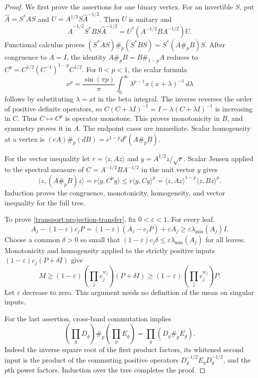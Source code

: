 \begin{proof}
We first prove the assertions for one binary vertex.  For an invertible
$S$, put $\widehat A=S^*AS$ and
$U=A^{1/2}S\widehat A^{-1/2}$.  Then $U$ is unitary and
\[
 \widehat A^{-1/2}S^*BS\widehat A^{-1/2}
 =U^*(A^{-1/2}BA^{-1/2})U.
\]
Functional calculus proves
$(S^*AS)\#_p(S^*BS)=S^*(A\#_pB)S$.
After congruence to $A=I$, the identity
$A\#_pB=B\#_{1-p}A$ reduces to
$C^p=C^{1/2}(C^{-1})^{1-p}C^{1/2}$.
For $0<p<1$, the scalar formula
\begin{equation}\label{transport:power-integral}
 x^p=\frac{\sin(\pi p)}{\pi}
       \int_0^\infty \lambda^{p-1}x(x+\lambda)^{-1}\,d\lambda
\end{equation}
follows by substituting $\lambda=xt$ in the beta integral.
The inverse reverses the order of positive definite operators, so
$C(C+\lambda I)^{-1}=I-\lambda(C+\lambda I)^{-1}$ is increasing in $C$.
Thus $C\mapsto C^p$ is operator monotone.  This proves monotonicity in
$B$, and symmetry proves it in $A$.  The endpoint cases are immediate.
Scalar homogeneity at a vertex is
$(cA)\#_p(dB)=c^{1-p}d^p(A\#_pB)$.

For the vector inequality let $r=\langle z,Az\rangle$ and
$y=A^{1/2}z/\sqrt r$.  Scalar Jensen applied to the spectral measure of
$C=A^{-1/2}BA^{-1/2}$ in the unit vector $y$ gives
\[
 \langle z,(A\#_pB)z\rangle
 =r\langle y,C^py\rangle
 \leq r\langle y,Cy\rangle^p
 =\langle z,Az\rangle^{1-p}\langle z,Bz\rangle^p.
\]
Induction proves the congruence, monotonicity, homogeneity, and vector
inequality for the full tree.

To prove \eqref{transport:projection-transfer}, fix $0<\varepsilon<1$.
For every leaf,
\[
 A_j-(1-\varepsilon)c_jP
 =(1-\varepsilon)(A_j-c_jP)+\varepsilon A_j
 \geq\varepsilon\lambda_{\min}(A_j)I.
\]
Choose a common $\delta>0$ so small that
$(1-\varepsilon)c_j\delta\leq\varepsilon\lambda_{\min}(A_j)$ for all
leaves.  Monotonicity and homogeneity applied to the strictly positive
inputs $(1-\varepsilon)c_j(P+\delta I)$ give
\[
 M\geq(1-\varepsilon)\left(\prod_jc_j^{w_j}\right)(P+\delta I)
 \geq(1-\varepsilon)\left(\prod_jc_j^{w_j}\right)P.
\]
Let $\varepsilon$ decrease to zero.  This argument needs no definition of
the mean on singular inputs.

For the last assertion, cross-band commutation implies
\[
 \left(\prod_gD_g\right)\#_p\left(\prod_gE_g\right)
 =\prod_g(D_g\#_pE_g).
\]
Indeed the inverse square root of the first product factors, its
whitened second input is the product of the commuting positive operators
$D_g^{-1/2}E_gD_g^{-1/2}$, and the $p$th power factors.  Induction over the
tree completes the proof.
\end{proof}


